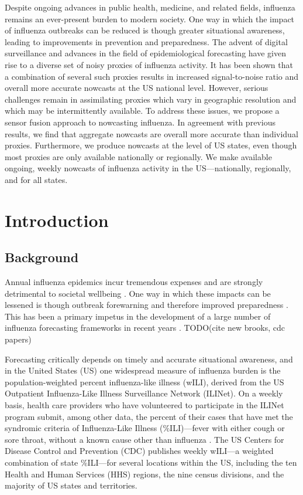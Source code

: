 \documentclass[10pt,letterpaper]{article}
\begin{document}
Despite ongoing advances in public health, medicine, and related fields,
influenza remains an ever-present burden to modern society. One way in which
the impact of influenza outbreaks can be reduced is though greater situational
awareness, leading to improvements in prevention and preparedness. The advent
of digital surveillance and advances in the field of epidemiological
forecasting have given rise to a diverse set of noisy proxies of influenza
activity. It has been shown that a combination of several such proxies results
in increased signal-to-noise ratio and overall more accurate nowcasts at the US
national level. However, serious challenges remain in assimilating proxies
which vary in geographic resolution and which may be intermittently available.
To address these issues, we propose a sensor fusion approach to nowcasting
influenza. In agreement with previous results, we find that aggregate nowcasts
are overall more accurate than individual proxies. Furthermore, we produce
nowcasts at the level of US states, even though most proxies are only available
nationally or regionally. We make available ongoing, weekly nowcasts of
influenza activity in the US---nationally, regionally, and for all states.

\linenumbers

\section*{Introduction}

\subsection*{Background}

Annual influenza epidemics incur tremendous expenses and are strongly
detrimental to societal wellbeing \cite{szucs1999socio, Stohr2002,
molinari2007annual, who_flu_impact}. One way in which these impacts can be
lessened is though outbreak forewarning and therefore improved preparedness
\cite{myers2000}. This has been a primary impetus in the development of a large
number of influenza forecasting frameworks in recent years \cite{nsoesie2013a,
chretien2014, brooks2015, farrow2017human}. TODO(cite new brooks, cdc papers)

Forecasting critically depends on timely and accurate situational awareness,
and in the United States (US) one widespread measure of influenza burden is the
population-weighted percent influenza-like illness (wILI), derived from the US
Outpatient Influenza-Like Illness Surveillance Network (ILINet). On a weekly
basis, health care providers who have volunteered to participate in the ILINet
program submit, among other data, the percent of their cases that have met the
syndromic criteria of Influenza-Like Illness (\%ILI)---fever with either cough
or sore throat, without a known cause other than influenza \cite{wilidef,
who_ili_def}. The US Centers for Disease Control and Prevention (CDC) publishes
weekly wILI---a weighted combination of state \%ILI---for several locations
within the US, including the ten Health and Human Services (HHS) regions, the
nine census divisions, and the majority of US states and territories.
\end{document}

